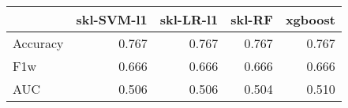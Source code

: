 \begin{tabular}{lrrrr}
\toprule
{} &  skl-SVM-l1 &  skl-LR-l1 &  skl-RF &  xgboost \\
\midrule
Accuracy &       0.767 &      0.767 &   0.767 &    0.767 \\
F1w      &       0.666 &      0.666 &   0.666 &    0.666 \\
AUC      &       0.506 &      0.506 &   0.504 &    0.510 \\
\bottomrule
\end{tabular}
